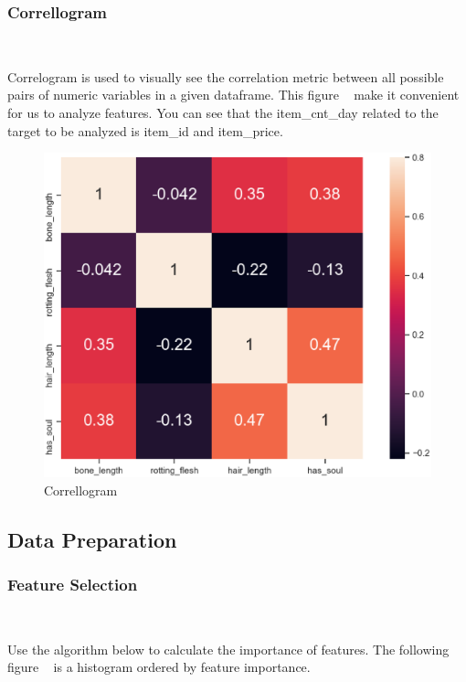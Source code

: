 \subsubsection{Correllogram}
\

Correlogram is used to 
visually see the correlation metric 
between all possible pairs of numeric variables 
in a given dataframe. 
This figure ~ 
make it convenient for us to analyze features.
You can see that the item_cnt_day related 
to the target to be analyzed is item_id and item_price.

\begin{figure}[htbp]
	\centering
	\includegraphics[scale=0.1]{figures/corr.eps}
	\caption{Correllogram}\label{fig:corr}
\end{figure}


\subsection{Data Preparation}



\subsubsection{Feature Selection}
\

Use the algorithm below to 
calculate the importance of features.
The following figure ~
is a histogram ordered by feature importance. 

